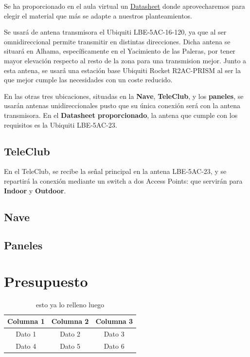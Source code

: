 \documentclass{article}
\begin{document}
Se ha proporcionado en el aula virtual un \href{http://www.microcom.com.ar/fotos/ficha7097LBE-M5-23.compressed.pdf}{Datasheet} donde aprovecharemos para elegir el material que más se adapte a nuestros planteamientos. 

\quad

Se usará de antena transmisora el Ubiquiti LBE-5AC-16-120, ya que al ser omnidireccional permite transmitir en distintas direcciones. Dicha antena se situará en Alhama, específicamente en el Yacimiento de las Paleras, por tener mayor elevación respecto al resto de la zona para una transmision mejor. Junto a esta antena, se usará una estación base Ubiquiti Rocket R2AC-PRISM al ser la que mejor cumple las necesidades con un coste reducido.

\quad

En las otras tres ubicaciones, situadas en la \textbf{Nave}, \textbf{TeleClub}, y los \textbf{paneles}, se usarán antenas unidireccionales pusto que su única conexión será con la antena transmisora. En el \textbf{Datasheet proporcionado}, la antena que cumple con los requisitos es la Ubiquiti LBE-5AC-23.

\subsection{TeleClub}

En el TeleClub, se recibe la señal principal en la antena LBE-5AC-23, y se repartirá la conexión mediante un switch a dos Access Points: que servirán para \textbf{Indoor} y \textbf{Outdoor}.    


\subsection{Nave}
\subsection{Paneles}

\section{Presupuesto}

\begin{table}[h]
    \centering
    \begin{tabular}{|c|c|c|}
        \hline
        Columna 1 & Columna 2 & Columna 3 \\
        \hline
        Dato 1 & Dato 2 & Dato 3 \\
        Dato 4 & Dato 5 & Dato 6 \\
        \hline
    \end{tabular}
    \caption{esto ya lo relleno luego}
    \label{tab:presupuestos}
\end{table}
\end{document}

